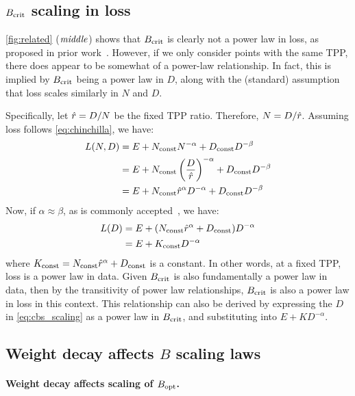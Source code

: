 \subsection{$B_{\text{crit}}$ scaling in loss}\label{sec:appendix_loss_scaling}

\cref{fig:related} ($\text{\emph{middle}}$) shows that $B_{\text{crit}}$ is clearly not a
power law in loss, as proposed in prior
work~\citep{mccandlish2018empirical,kaplan2020scaling,li2024surge}.
However, if we only consider points with the same TPP, there does
appear to be somewhat of a power-law relationship.  In fact, this is
implied by $B_{\text{crit}}$ being a power law in $D$, along with the (standard)
assumption that loss scales similarly in $N$ and $D$.

Specifically, let $\hat{r} = {D}/{N}$ be the fixed TPP ratio.
Therefore, $N = {D}/{\hat{r}}$.  Assuming loss follows
\cref{eq:chinchilla}, we have:
\begin{align*}
L(N,D) &= E + N_{\text{const}} N^{-\alpha} + D_{\text{const}} D^{-\beta} \\
       &= E + N_{\text{const}} \left( \frac{D}{\hat{r}} \right)^{-\alpha} + D_{\text{const}} D^{-\beta} \\
       &= E + N_{\text{const}} \hat{r}^{\alpha} D^{-\alpha} + D_{\text{const}} D^{-\beta}
\end{align*}
Now, if $\alpha \approx \beta$, as is commonly
accepted~\citep{hoffmann2022empirical,besiroglu2024chinchilla,krajewski2024scaling,porian2024resolving,gadre2024language}, we have:
\begin{align*}
  L(D) &= E + (N_{\text{const}} \hat{r}^{\alpha} + D_{\text{const}}) D^{-\alpha} \\
   &= E + K_{\text{const}} D^{-\alpha}
\end{align*}
where $K_{\text{const}} = N_{\text{const}} \hat{r}^{\alpha} + D_{\text{const}}$ is a constant.  In
other words, at a fixed TPP, loss is a power law in data.  Given
$B_{\text{crit}}$ is also fundamentally a power law in data, then by the
transitivity of power law relationships, $B_{\text{crit}}$ is also a power law in
loss in this context.  This relationship can also be derived by
expressing the $D$ in \cref{eq:cbs_scaling} as a power law in $B_{\text{crit}}$,
and substituting into $E + K D^{-\alpha}$.

\subsection{Weight decay affects $B$ scaling laws}\label{sec:app_wd_affects_b}



\paragraph{Weight decay affects scaling of $B_{\text{opt}}$.}

